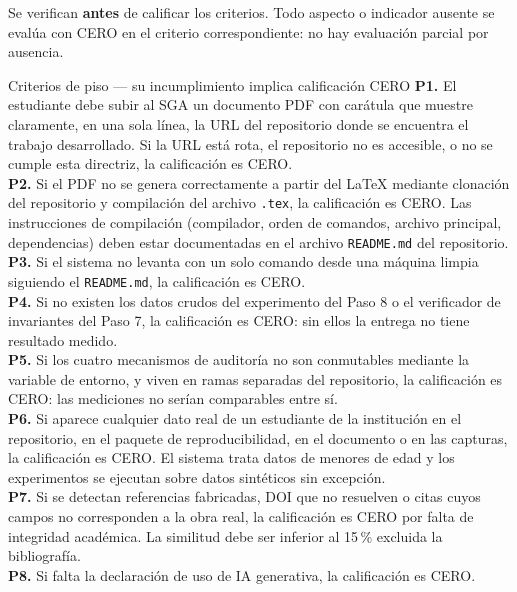 \documentclass[11pt,a4paper]{article}
\begin{document}
	Se verifican \textbf{antes} de calificar los criterios. Todo aspecto o indicador ausente se evalúa con CERO en el criterio correspondiente: no hay evaluación parcial por ausencia.
	
	\begin{pisoBox}{Criterios de piso --- su incumplimiento implica calificación CERO}
		\textbf{P1.} El estudiante debe subir al SGA un documento PDF con carátula que muestre claramente, en una sola línea, la URL del repositorio donde se encuentra el trabajo desarrollado. Si la URL está rota, el repositorio no es accesible, o no se cumple esta directriz, la calificación es CERO.\\[5pt]
		\textbf{P2.} Si el PDF no se genera correctamente a partir del LaTeX mediante clonación del repositorio y compilación del archivo \texttt{.tex}, la calificación es CERO. Las instrucciones de compilación (compilador, orden de comandos, archivo principal, dependencias) deben estar documentadas en el archivo \texttt{README.md} del repositorio.\\[5pt]
		\textbf{P3.} Si el sistema no levanta con un solo comando desde una máquina limpia siguiendo el \texttt{README.md}, la calificación es CERO.\\[5pt]
		\textbf{P4.} Si no existen los datos crudos del experimento del Paso 8 o el verificador de invariantes del Paso 7, la calificación es CERO: sin ellos la entrega no tiene resultado medido.\\[5pt]
		\textbf{P5.} Si los cuatro mecanismos de auditoría no son conmutables mediante la variable de entorno, y viven en ramas separadas del repositorio, la calificación es CERO: las mediciones no serían comparables entre sí.\\[5pt]
		\textbf{P6.} Si aparece cualquier dato real de un estudiante de la institución en el repositorio, en el paquete de reproducibilidad, en el documento o en las capturas, la calificación es CERO. El sistema trata datos de menores de edad y los experimentos se ejecutan sobre datos sintéticos sin excepción.\\[5pt]
		\textbf{P7.} Si se detectan referencias fabricadas, DOI que no resuelven o citas cuyos campos no corresponden a la obra real, la calificación es CERO por falta de integridad académica. La similitud debe ser inferior al 15\,\% excluida la bibliografía.\\[5pt]
		\textbf{P8.} Si falta la declaración de uso de IA generativa, la calificación es CERO.
	\end{pisoBox}
	
\end{document}

